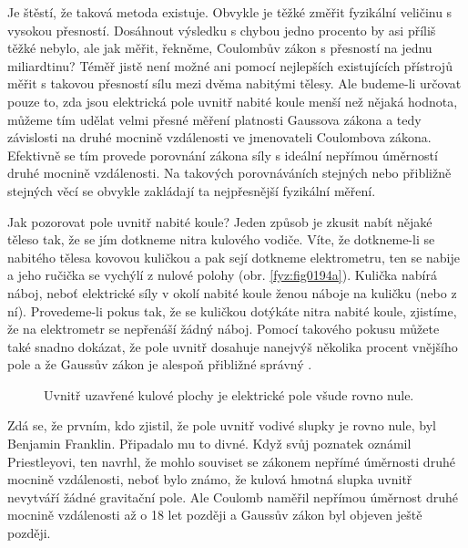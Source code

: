   Je štěstí, že taková metoda existuje. Obvykle je těžké změřit fyzikální veličinu s vysokou 
  přesností. Dosáhnout výsledku s chybou jedno procento by asi příliš těžké nebylo, ale jak 
  měřit, řekněme, Coulombův zákon s přesností na jednu miliardtinu? Téměř jistě není možné ani 
  pomocí nejlepších existujících přístrojů měřit s takovou přesností sílu mezi dvěma nabitými 
  tělesy. Ale budeme-li určovat pouze to, zda jsou elektrická pole uvnitř nabité koule menší 
  než nějaká hodnota, můžeme tím udělat velmi přesné měření platnosti Gaussova zákona a tedy 
  závislosti na druhé mocnině vzdálenosti ve jmenovateli Coulombova zákona. Efektivně se tím 
  provede porovnání zákona síly s ideální nepřímou úměrností druhé mocnině vzdálenosti. Na 
  takových porovnáváních stejných nebo přibližně stejných věcí se obvykle zakládají ta 
  nejpřesnější fyzikální měření.
  
  Jak pozorovat pole uvnitř nabité koule? Jeden způsob je zkusit nabít nějaké těleso tak, že se 
  jím dotkneme nitra kulového vodiče. Víte, že dotkneme-li se nabitého tělesa kovovou kuličkou 
  a pak sejí dotkneme elektrometru, ten se nabije a jeho ručička se vychýlí z nulové polohy 
  (obr. \ref{fyz:fig0194a}). Kulička nabírá náboj, neboť elektrické síly v okolí 
  nabité koule ženou náboje na kuličku (nebo z ní). Provedeme-li pokus tak, že se kuličkou 
  dotýkáte nitra nabité koule, zjistíme, že na elektrometr se nepřenáší žádný náboj. Pomocí 
  takového pokusu můžete také snadno dokázat, že pole uvnitř dosahuje nanejvýš několika procent 
  vnějšího pole a že Gaussův zákon je alespoň přibližné správný \cite[s.~91]{Feynman02}.
  \begin{figure}[hb!]
    \centering
    \caption{Uvnitř uzavřené kulové plochy je elektrické pole všude rovno nule.}
    \label{fyz:fig0194}
  \end{figure}
    
  Zdá se, že prvním, kdo zjistil, že pole uvnitř vodivé slupky je rovno nule, byl Benjamin 
  Franklin. Připadalo mu to divné. Když svůj poznatek oznámil Priestleyovi, ten navrhl, že 
  mohlo souviset se zákonem nepřímé úměrnosti druhé mocnině vzdálenosti, neboť bylo známo, že 
  kulová hmotná slupka uvnitř nevytváří žádné gravitační pole. Ale Coulomb naměřil nepřímou 
  úměrnost druhé mocnině vzdálenosti až o 18 let později a Gaussův zákon byl objeven ještě 
  později.
  
